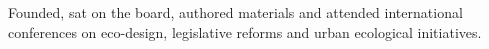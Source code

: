 \documentclass[line,margin,hidelinks]{res}
\begin{document}
\begin{resume}

\begin{position}
  Founded, sat on the board, authored materials and attended international conferences on eco-design, legislative reforms and urban ecological initiatives.
\end{position}


%



\end{resume}
\end{document}
